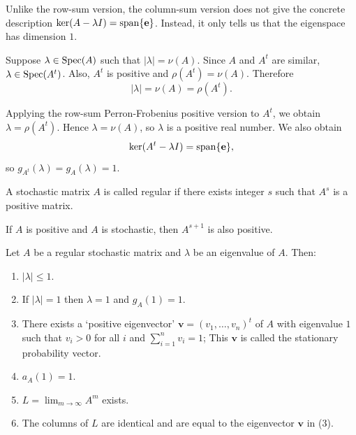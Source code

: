 \begin{remark}
Unlike the row-sum version, the column-sum version does not give the concrete description $\ker(A-\lambda I)=\operatorname{span}\{\mathbf{e}\}$. Instead, it only tells us that the eigenspace has dimension $1$.
\end{remark}

\begin{pfbox}
Suppose $\lambda\in\operatorname{Spec}(A)$ such that $|\lambda|=\nu(A)$. Since $A$ and $A^t$ are similar, $\lambda\in\operatorname{Spec}(A^t)$. Also, $A^t$ is positive and $\rho(A^t)=\nu(A)$. Therefore
\[
|\lambda|
=
\nu(A)
=
\rho(A^t).
\]

Applying the row-sum Perron-Frobenius positive version to $A^t$, we obtain $\lambda=\rho(A^t)$. Hence $\lambda=\nu(A)$, so $\lambda$ is a positive real number. We also obtain
\[
\ker(A^t-\lambda I)
=
\operatorname{span}\{\mathbf{e}\},
\]
so $g_{A^t}(\lambda) = g_{A}(\lambda)=1$.
\end{pfbox}


\begin{definition}
A stochastic matrix $A$ is called regular if there exists integer $s$ such that $A^s$ is a positive matrix.
\end{definition}

\begin{remark}
If $A$ is positive and $A$ is stochastic, then $A^{s+1}$ is also positive.
\end{remark}


\begin{theorem}
Let $A$ be a regular stochastic matrix and $\lambda$ be an eigenvalue of $A$. Then:
\begin{enumerate}
    \item $|\lambda|\le 1$.
    \item If $|\lambda|=1$ then $\lambda=1$ and $g_A(1)=1$.
    \item There exists a `positive eigenvector' $\mathbf{v}=(v_1,\dots,v_n)^t$ of $A$ with eigenvalue $1$ such that $v_i>0$ for all $i$ and $\displaystyle\sum_{i=1}^n v_i=1$; This $\mathbf{v}$ is called the stationary probability vector.
    \item $a_A(1)=1$.
    \item $L=\lim_{m\to\infty} A^m$ exists.
    \item The columns of $L$ are identical and are equal to the eigenvector $\mathbf{v}$ in (3).
\end{enumerate}
\end{theorem}



